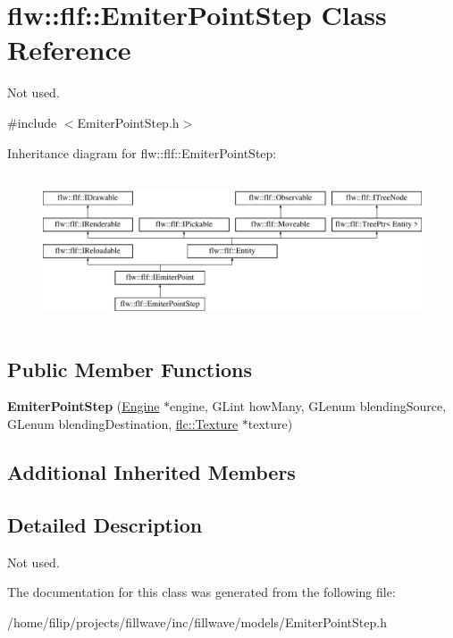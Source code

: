 \hypertarget{classflw_1_1flf_1_1EmiterPointStep}{}\section{flw\+:\+:flf\+:\+:Emiter\+Point\+Step Class Reference}
\label{classflw_1_1flf_1_1EmiterPointStep}


Not used.  




{\ttfamily \#include $<$Emiter\+Point\+Step.\+h$>$}

Inheritance diagram for flw\+:\+:flf\+:\+:Emiter\+Point\+Step\+:\begin{figure}[H]
\begin{center}
\leavevmode
\includegraphics[height=4.487180cm]{classflw_1_1flf_1_1EmiterPointStep}
\end{center}
\end{figure}
\subsection*{Public Member Functions}
\begin{DoxyCompactItemize}
\item 
\mbox{\label{classflw_1_1flf_1_1EmiterPointStep_afb53156f26a793f33e0d86646b87c4cc}} 
{\bfseries Emiter\+Point\+Step} (\hyperlink{classflw_1_1Engine}{Engine} $\ast$engine, G\+Lint how\+Many, G\+Lenum blending\+Source, G\+Lenum blending\+Destination, \hyperlink{classflw_1_1flc_1_1Texture}{flc\+::\+Texture} $\ast$texture)
\end{DoxyCompactItemize}
\subsection*{Additional Inherited Members}


\subsection{Detailed Description}
Not used. 

The documentation for this class was generated from the following file\+:\begin{DoxyCompactItemize}
\item 
/home/filip/projects/fillwave/inc/fillwave/models/Emiter\+Point\+Step.\+h\end{DoxyCompactItemize}

